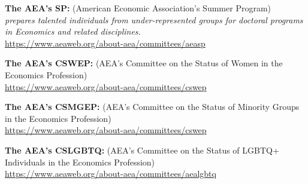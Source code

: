 \documentclass[a4paper, 10pt]{article}
\begin{document}
\noindent \textbf{The AEA's SP:} (American Economic Association's Summer Program)\\
\textit{prepares talented individuals from under-represented groups for doctoral programs in Economics and related disciplines.} \\
\href{https://www.aeaweb.org/about-aea/committees/aeasp}{https://www.aeaweb.org/about-aea/committees/aeasp}

\noindent \textbf{The AEA's CSWEP:} (AEA's Committee on the Status of Women in the Economics Profession) \\
\href{https://www.aeaweb.org/about-aea/committees/cswep}{https://www.aeaweb.org/about-aea/committees/cswep}

\noindent \textbf{The AEA's CSMGEP:} (AEA's Committee on the Status of Minority Groups in the Economics Profession) \\
\href{https://www.aeaweb.org/about-aea/committees/cswep}{https://www.aeaweb.org/about-aea/committees/cswep}

\noindent \textbf{The AEA's CSLGBTQ:} (AEA's Committee on the Status of LGBTQ+ Individuals in the Economics Profession) \\
\href{https://www.aeaweb.org/about-aea/committees/aealgbtq}{https://www.aeaweb.org/about-aea/committees/aealgbtq}
\end{document}

